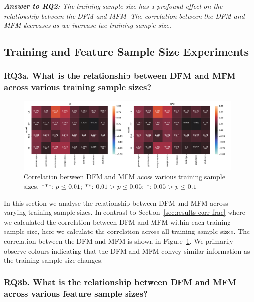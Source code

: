 \documentclass{article}
\newcommand{\highlight}[1]{\begin{framed}%
  \noindent\emph{#1}
\end{framed}}
\begin{document}
\highlight{\textbf{Answer to RQ2:} The training sample size has
a profound effect on the relationship between the DFM and MFM. The
correlation between the DFM and MFM decreases as we increase the
training sample size.}

\subsection{Training and Feature Sample Size
Experiments}\label{sec:results-training-feature-sets}
\subsubsection{RQ3a. What is the relationship between DFM and MFM
across various training sample sizes?}\label{sec:results-training-sets}

\begin{figure}
  \centering
  \includegraphics[width=0.95\linewidth]{heatmap--corr--frac.pdf}
  \caption{Correlation between DFM and MFM acoss various training
  sample sizes. ***: $p \le 0.01$; **: $0.01 > p \le 0.05$; *: $0.05
  > p \le 0.1$}
  \label{fig:heatmap--corr--frac}
\end{figure}

In this section we analyse the relationship between DFM and MFM across
varying training sample sizes. In contrast to
Section \ref{sec:results-corr-frac} where we calculated the
correlation between DFM and MFM within each training sample size, here
we calculate the correlation across all training sample sizes. The
correlation between the DFM and MFM is shown in
Figure \ref{fig:heatmap--corr--frac}. We primarily observe colours
indicating that the DFM and MFM convey similar information as the
training sample size changes.

\subsubsection{RQ3b. What is the relationship between DFM and MFM
across various feature sample sizes?}\label{sec:results-feature-sets}
\end{document}
